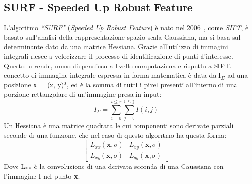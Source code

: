 \subsection{SURF - Speeded Up Robust Feature}
\noindent L'algoritmo \textit{``SURF''} (\textit{Speeded Up Robust Feature}) è nato nel 2006~\cite{BAY2008346}, come \textit{SIFT}, è basato sull'analisi della rappresentazione spazio-scala Gaussiana, ma si basa sul determinante dato da una matrice Hessiana. Grazie all'utilizzo di immagini integrali riesce a velocizzare il processo di identificazione di punti d'interesse. Questo lo rende, meno dispendioso a livello computazionale rispetto a SIFT.\hfill \break
\noindent Il concetto di immagine integrale espressa in forma matematica è data da I\(_{\Sigma}\) ad una posizione \textbf{x} = (x, y)\(^{T}\), ed è la somma di tutti i pixel presenti all'interno di una porzione rettangolare di un'immagine presa in input:
\begin{equation}
	I_{\Sigma} = \sum^{i \leq x}_{i=0} \sum^{i \leq y}_{j=0} I (i, j)
\end{equation}
\noindent Un Hessiana è una matrice quadrata le cui componenti sono derivate parziali seconde di una funzione, che nel caso di questo algoritmo ha questa forma:
\begin{equation}
	\begin{bmatrix}
		L_{xx}(\textbf{x}, \sigma) & L_{xy}(\textbf{x}, \sigma) \\
		L_{xy}(\textbf{x}, \sigma) & L_{yy}(\textbf{x}, \sigma)
	\end{bmatrix}
\end{equation}
\noindent Dove L\(_{**}\) è la convoluzione di una derivata seconda di una Gaussiana con l'immagine I nel punto \textbf{x}.
